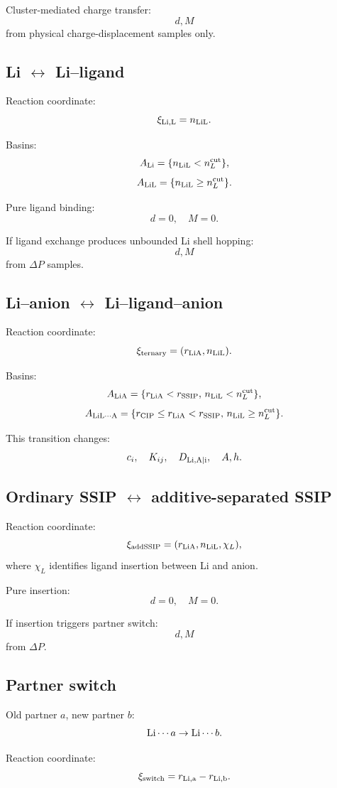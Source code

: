 Cluster-mediated charge transfer:
\[
d,M
\]
from physical charge-displacement samples only.

\subsection{Li \(\leftrightarrow\) Li--ligand}

Reaction coordinate:
\[
\xi_{\rm Li,L}=n_{\rm LiL}.
\]

Basins:
\[
A_{\rm Li}=\{n_{\rm LiL}<n_L^{\rm cut}\},
\]
\[
A_{\rm LiL}=\{n_{\rm LiL}\ge n_L^{\rm cut}\}.
\]

Pure ligand binding:
\[
d=0,\quad M=0.
\]

If ligand exchange produces unbounded Li shell hopping:
\[
d,M
\]
from \(\Delta P\) samples.

\subsection{Li--anion \(\leftrightarrow\) Li--ligand--anion}

Reaction coordinate:
\[
\xi_{\rm ternary}=(r_{\rm LiA},n_{\rm LiL}).
\]

Basins:
\[
A_{\rm LiA}
=
\{r_{\rm LiA}<r_{\rm SSIP},\,n_{\rm LiL}<n_L^{\rm cut}\},
\]
\[
A_{\rm LiL\cdots A}
=
\{r_{\rm CIP}\le r_{\rm LiA}<r_{\rm SSIP},\,n_{\rm LiL}\ge n_L^{\rm cut}\}.
\]

This transition changes:
\[
c_i,\quad K_{ij},\quad D_{\rm Li,A|i},\quad A,h.
\]

\subsection{Ordinary SSIP \(\leftrightarrow\) additive-separated SSIP}

Reaction coordinate:
\[
\xi_{\rm addSSIP}=(r_{\rm LiA},n_{\rm LiL},\chi_L),
\]
where \(\chi_L\) identifies ligand insertion between Li and anion.

Pure insertion:
\[
d=0,\quad M=0.
\]

If insertion triggers partner switch:
\[
d,M
\]
from \(\Delta P\).

\subsection{Partner switch}

Old partner \(a\), new partner \(b\):
\[
{\rm Li}\cdots a \to {\rm Li}\cdots b.
\]

Reaction coordinate:
\[
\xi_{\rm switch}=r_{\rm Li,a}-r_{\rm Li,b}.
\]


